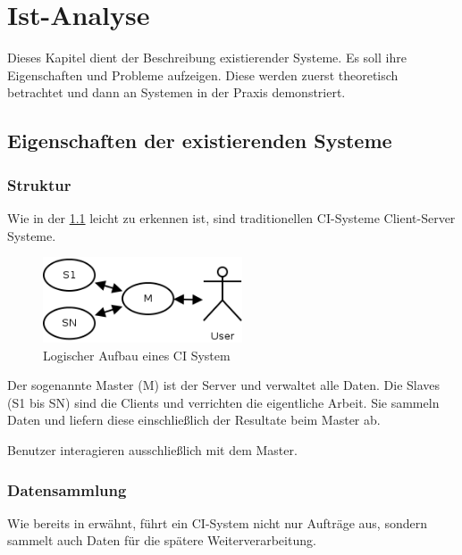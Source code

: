 \chapter{Ist-Analyse}
\label{chap:ist-analyse}

Dieses Kapitel dient der Beschreibung existierender Systeme.
Es soll ihre Eigenschaften und Probleme aufzeigen.
Diese werden zuerst theoretisch betrachtet und
dann an Systemen in der Praxis demonstriert.


\section{Eigenschaften der existierenden Systeme}

\subsection{Struktur}
\label{sec:ist-analyse:struktur}

Wie in der \cref{fig:ist-aufbau-tradition} leicht zu erkennen ist,
sind traditionellen \ac{CI}-Systeme Client-Server Systeme.

\begin{figure}[ht]
  \centering
  \includegraphics[height=1in]{imageinput/ist-aufbau-tradition.png}
  \caption{Logischer Aufbau eines CI System}
  \label{fig:ist-aufbau-tradition}
\end{figure}

Der sogenannte Master (M) ist der Server und verwaltet alle Daten.
Die Slaves (S1 bis SN) sind die Clients und verrichten die eigentliche Arbeit.
Sie sammeln Daten und liefern diese einschließlich der Resultate beim Master ab.

Benutzer interagieren ausschließlich mit dem Master.

\subsection{Datensammlung}
Wie bereits in  erwähnt,
führt ein \ac{CI}-System nicht nur Aufträge aus,
sondern sammelt auch Daten für die spätere Weiterverarbeitung.

